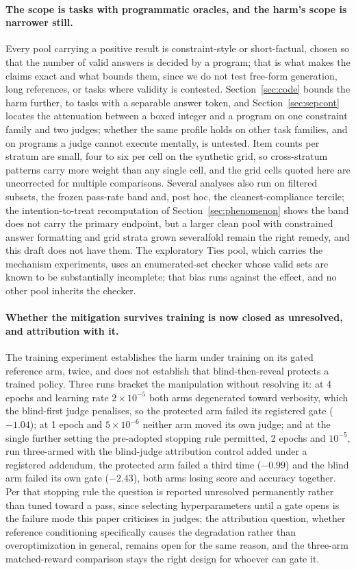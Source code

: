 \documentclass[11pt]{article}
\begin{document}
\paragraph{The scope is tasks with programmatic oracles, and the harm's scope is narrower still.}
Every pool carrying a positive result is constraint-style or short-factual, chosen so that the number of valid answers is decided by a program; that is what makes the claims exact and what bounds them, since we do not test free-form generation, long references, or tasks where validity is contested.
Section~\ref{sec:code} bounds the harm further, to tasks with a separable answer token, and Section~\ref{sec:sepcont} locates the attenuation between a boxed integer and a program on one constraint family and two judges; whether the same profile holds on other task families, and on programs a judge cannot execute mentally, is untested.
Item counts per stratum are small, four to six per cell on the synthetic grid, so cross-stratum patterns carry more weight than any single cell, and the grid cells quoted here are uncorrected for multiple comparisons.
Several analyses also run on filtered subsets, the frozen pass-rate band and, post hoc, the cleanest-compliance tercile; the intention-to-treat recomputation of Section~\ref{sec:phenomenon} shows the band does not carry the primary endpoint, but a larger clean pool with constrained answer formatting and grid strata grown severalfold remain the right remedy, and this draft does not have them.
The exploratory Ties pool, which carries the mechanism experiments, uses an enumerated-set checker whose valid sets are known to be substantially incomplete; that bias runs against the effect, and no other pool inherits the checker.

\paragraph{Whether the mitigation survives training is now closed as unresolved, and attribution with it.}
The training experiment establishes the harm under training on its gated reference arm, twice, and does not establish that blind-then-reveal protects a trained policy.
Three runs bracket the manipulation without resolving it: at 4 epochs and learning rate $2\times10^{-5}$ both arms degenerated toward verbosity, which the blind-first judge penalises, so the protected arm failed its registered gate ($-1.04$); at 1 epoch and $5\times10^{-6}$ neither arm moved its own judge; and at the single further setting the pre-adopted stopping rule permitted, 2 epochs and $10^{-5}$, run three-armed with the blind-judge attribution control added under a registered addendum, the protected arm failed a third time ($-0.99$) and the blind arm failed its own gate ($-2.43$), both arms losing score and accuracy together.
Per that stopping rule the question is reported unresolved permanently rather than tuned toward a pass, since selecting hyperparameters until a gate opens is the failure mode this paper criticises in judges; the attribution question, whether reference conditioning specifically causes the degradation rather than overoptimization in general, remains open for the same reason, and the three-arm matched-reward comparison stays the right design for whoever can gate it.
\end{document}
